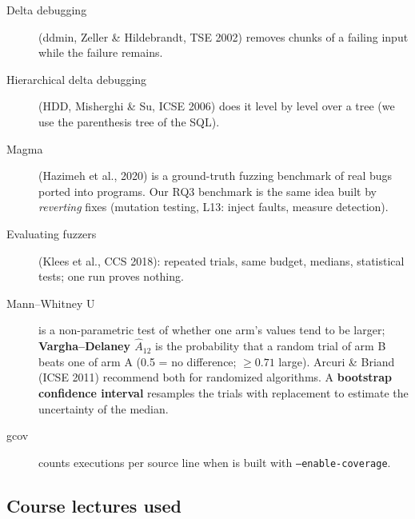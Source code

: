 \begin{description}
  \item[Delta debugging] (ddmin, Zeller \& Hildebrandt, TSE 2002) removes
    chunks of a failing input while the failure remains.
  \item[Hierarchical delta debugging] (HDD, Misherghi \& Su, ICSE 2006) does
    it level by level over a tree (we use the parenthesis tree of the SQL).
  \item[Magma] (Hazimeh et al., 2020) is a ground-truth fuzzing benchmark of
    real bugs ported into programs. Our RQ3 benchmark is the same idea built by
    \emph{reverting} fixes (mutation testing, L13: inject faults, measure
    detection).
  \item[Evaluating fuzzers] (Klees et al., CCS 2018): repeated trials, same
    budget, medians, statistical tests; one run proves nothing.
  \item[Mann--Whitney U] is a non-parametric test of whether one arm's values
    tend to be larger; \textbf{Vargha--Delaney $\hat A_{12}$} is the probability
    that a random trial of arm B beats one of arm A (0.5 = no difference;
    $\geq 0.71$ large). Arcuri \& Briand (ICSE 2011) recommend both for
    randomized algorithms. A \textbf{bootstrap confidence interval} resamples
    the trials with replacement to estimate the uncertainty of the median.
  \item[gcov] counts executions per source line when \pg is built with
    \texttt{--enable-coverage}.
\end{description}

\subsection{Course lectures used}

